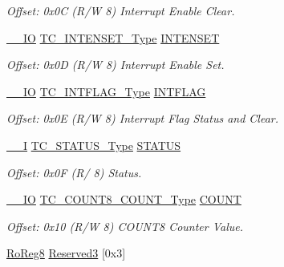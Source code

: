 \begin{DoxyCompactItemize}
\begin{DoxyCompactList}\small\item\em Offset\+: 0x0C (R/W 8) Interrupt Enable Clear. \end{DoxyCompactList}\item 
\mbox{\hyperlink{core__cm0plus_8h_aec43007d9998a0a0e01faede4133d6be}{\+\_\+\+\_\+\+IO}} \mbox{\hyperlink{union_t_c___i_n_t_e_n_s_e_t___type}{T\+C\+\_\+\+I\+N\+T\+E\+N\+S\+E\+T\+\_\+\+Type}} \mbox{\hyperlink{struct_tc_count8_a59e384762759e5950e3d32d1f3b358d6}{I\+N\+T\+E\+N\+S\+ET}}
\begin{DoxyCompactList}\small\item\em Offset\+: 0x0D (R/W 8) Interrupt Enable Set. \end{DoxyCompactList}\item 
\mbox{\hyperlink{core__cm0plus_8h_aec43007d9998a0a0e01faede4133d6be}{\+\_\+\+\_\+\+IO}} \mbox{\hyperlink{union_t_c___i_n_t_f_l_a_g___type}{T\+C\+\_\+\+I\+N\+T\+F\+L\+A\+G\+\_\+\+Type}} \mbox{\hyperlink{struct_tc_count8_a076bcac2737bf4d77b94d8ca8362a8f0}{I\+N\+T\+F\+L\+AG}}
\begin{DoxyCompactList}\small\item\em Offset\+: 0x0E (R/W 8) Interrupt Flag Status and Clear. \end{DoxyCompactList}\item 
\mbox{\hyperlink{core__cm0plus_8h_af63697ed9952cc71e1225efe205f6cd3}{\+\_\+\+\_\+I}} \mbox{\hyperlink{union_t_c___s_t_a_t_u_s___type}{T\+C\+\_\+\+S\+T\+A\+T\+U\+S\+\_\+\+Type}} \mbox{\hyperlink{struct_tc_count8_af7f33b0963c8311ce45fe0f929a1a9c5}{S\+T\+A\+T\+US}}
\begin{DoxyCompactList}\small\item\em Offset\+: 0x0F (R/ 8) Status. \end{DoxyCompactList}\item 
\mbox{\hyperlink{core__cm0plus_8h_aec43007d9998a0a0e01faede4133d6be}{\+\_\+\+\_\+\+IO}} \mbox{\hyperlink{union_t_c___c_o_u_n_t8___c_o_u_n_t___type}{T\+C\+\_\+\+C\+O\+U\+N\+T8\+\_\+\+C\+O\+U\+N\+T\+\_\+\+Type}} \mbox{\hyperlink{struct_tc_count8_a4013179057c7f588fa06c60887f76125}{C\+O\+U\+NT}}
\begin{DoxyCompactList}\small\item\em Offset\+: 0x10 (R/W 8) C\+O\+U\+N\+T8 Counter Value. \end{DoxyCompactList}\item 
\mbox{\hyperlink{group___s_a_m_d21_e15_a__definitions_ga0d957f1433aaf5d70e4dc2b68288442d}{Ro\+Reg8}} \mbox{\hyperlink{struct_tc_count8_ab22abf5c83fa4a01809facc55e0fda29}{Reserved3}} \mbox{[}0x3\mbox{]}

\end{DoxyCompactItemize}

